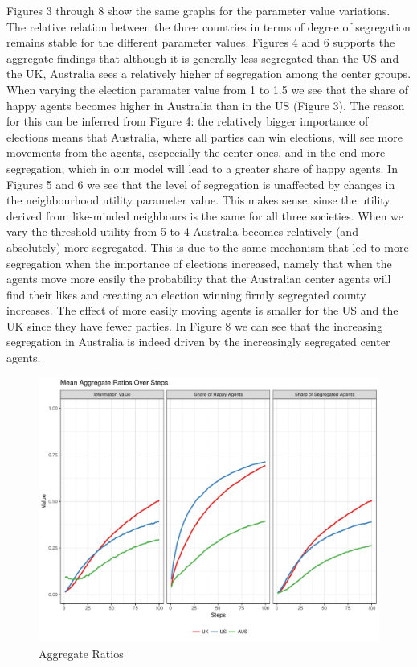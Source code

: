 \documentclass[12pt, a4paper]{article}
\begin{document}
	Figures 3 through 8 show the same graphs for the parameter value variations. The relative relation between the three countries in terms of degree of segregation remains stable for the different parameter values. Figures 4 and 6 supports the aggregate findings that although it is generally less segregated than the US and the UK, Australia sees a relatively higher of segregation among the center groups. When varying the election paramater value from 1 to 1.5 we see that the share of happy agents becomes higher in Australia than in the US (Figure 3). The reason for this can be inferred from Figure 4: the relatively bigger importance of elections means that Australia, where all parties can win elections, will see more movements from the agents, escpecially the center ones, and in the end more segregation, which in our model will lead to a greater share of happy agents. In Figures 5 and 6 we see that the level of segregation is unaffected by changes in the neighbourhood utility parameter value. This makes sense, sinse the utility derived from like-minded neighbours is the same for all three societies. When we vary the threshold utility from 5 to 4 Australia becomes relatively (and absolutely) more segregated. This is due to the same mechanism that led to more segregation when the importance of elections increased, namely that when the agents move more easily the probability that the Australian center agents will find their likes and creating an election winning firmly segregated county increases. The effect of more easily moving agents is smaller for the US and the UK since they have fewer parties. In Figure 8 we can see that the increasing segregation in Australia is indeed driven by the increasingly segregated center agents.        
	
	\begin{figure}[bp!]
		\centering
		\caption{Aggregate Ratios}
		\includegraphics[scale=0.6]{./Plots/agg_ratios.pdf}
	\end{figure}
	
\end{document}
